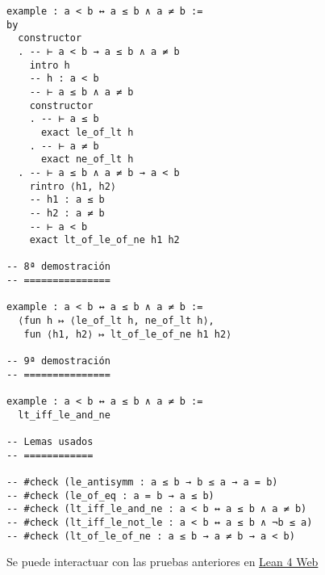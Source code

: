\begin{verbatim}
example : a < b ↔ a ≤ b ∧ a ≠ b :=
by
  constructor
  . -- ⊢ a < b → a ≤ b ∧ a ≠ b
    intro h
    -- h : a < b
    -- ⊢ a ≤ b ∧ a ≠ b
    constructor
    . -- ⊢ a ≤ b
      exact le_of_lt h
    . -- ⊢ a ≠ b
      exact ne_of_lt h
  . -- ⊢ a ≤ b ∧ a ≠ b → a < b
    rintro ⟨h1, h2⟩
    -- h1 : a ≤ b
    -- h2 : a ≠ b
    -- ⊢ a < b
    exact lt_of_le_of_ne h1 h2

-- 8ª demostración
-- ===============

example : a < b ↔ a ≤ b ∧ a ≠ b :=
  ⟨fun h ↦ ⟨le_of_lt h, ne_of_lt h⟩,
   fun ⟨h1, h2⟩ ↦ lt_of_le_of_ne h1 h2⟩

-- 9ª demostración
-- ===============

example : a < b ↔ a ≤ b ∧ a ≠ b :=
  lt_iff_le_and_ne

-- Lemas usados
-- ============

-- #check (le_antisymm : a ≤ b → b ≤ a → a = b)
-- #check (le_of_eq : a = b → a ≤ b)
-- #check (lt_iff_le_and_ne : a < b ↔ a ≤ b ∧ a ≠ b)
-- #check (lt_iff_le_not_le : a < b ↔ a ≤ b ∧ ¬b ≤ a)
-- #check (lt_of_le_of_ne : a ≤ b → a ≠ b → a < b)
\end{verbatim}
Se puede interactuar con las pruebas anteriores en \href{https://lean.math.hhu.de/\#url=https://raw.githubusercontent.com/jaalonso/Calculemus2/main/src/Caracterizacion\_de\_menor\_en\_ordenes\_parciales.lean}{Lean 4 Web}

